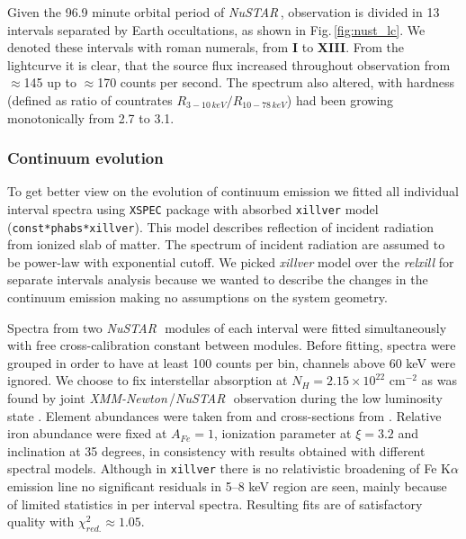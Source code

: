 \documentclass[a4paper,fleqn,usenatbib]{mnras}
\def\xmm{{\em XMM-Newton\,}}
\def\nustar{{\em NuSTAR\,}}
\begin{document}
Given the 96.9 minute orbital period of \nustar, observation is divided in 13 intervals separated by Earth occultations, as shown in Fig.\,\ref{fig:nust_lc}. 
We denoted these intervals with roman numerals, from {\bf I} to {\bf XIII}. 
From the lightcurve it is clear, that the source flux increased throughout observation from $\approx$145 up to $\approx$170 counts per second. 
The spectrum also altered, with hardness (defined as ratio of countrates  $R_{3-10\,keV}/R_{10-78\,keV}$) had been growing monotonically from 2.7 to 3.1. 


\subsubsection{Continuum evolution}
\label{sec:continuum_evolution}
To get better view on the evolution of continuum emission we fitted all individual interval spectra using \texttt{XSPEC} package \citep{arnaud96} with absorbed \texttt{xillver} \citep{garcia13} model (\texttt{const*phabs*xillver}). 
This model describes reflection of incident radiation from ionized slab of matter. 
The spectrum of incident radiation are assumed to be power-law with exponential cutoff. 
We picked {\it xillver} model over the {\it relxill} for separate intervals analysis because we wanted to describe the changes in the continuum emission making no assumptions on the system geometry. 

Spectra from two \nustar\, modules of each interval were fitted simultaneously with free cross-calibration constant between modules.
Before fitting, spectra were grouped in order to have at least 100 counts per bin, channels above 60 keV were ignored. 
We choose to fix interstellar absorption at $N_{H} = 2.15\times10^{22}$ cm$^{-2}$ as was found by joint \xmm/\nustar\, observation during the low luminosity state \citep{fuerst16}. 
Element abundances were taken from \cite{wilms00} and cross-sections from \cite{verner96}. 
Relative iron abundance were fixed at  $A_{Fe} = 1$, ionization parameter at $\xi=3.2$ and inclination at 35 degrees, in consistency with \citet{miller15_nust} results obtained with different spectral models. 
Although in  \texttt{xillver} there is no relativistic broadening of Fe K$\alpha$ emission line no significant residuals in 5--8 keV region are seen, mainly because of limited statistics in per interval spectra. 
Resulting fits are of satisfactory quality with $\chi^{2}_{red.} \approx 1.05$. 
 
\end{document}
